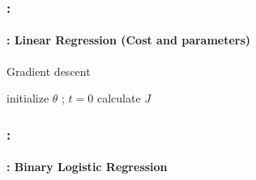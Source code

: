 \documentclass[xcolor=table]{beamer}
\begin{document}
\begin{frame}
	\frametitle{\insertshortsubtitle: \insertsection}
	\framesubtitle{\insertsubsection: Linear Regression (Cost and parameters)}
	
	\begin{minipage}{0.7\textwidth} 
		\begin{block}{Gradient descent}
			\begin{algorithm}[H]
				\KwResult{$ \theta $}
				initialize $ \theta $ ; $ t = 0 $\;
				calculate $ J $\;
			\end{algorithm}
		\end{block}
	\end{minipage}
	\begin{minipage}{0.29\textwidth} 
	\end{minipage}
	
	
\end{frame}

\begin{frame}
	\frametitle{\insertshortsubtitle: \insertsection}
	\framesubtitle{\insertsubsection: Binary Logistic Regression}
	
	\begin{minipage}{0.5\textwidth} 
	\end{minipage}
	\begin{minipage}{0.49\textwidth} 
	\end{minipage}
	
\end{frame}
\end{document}
